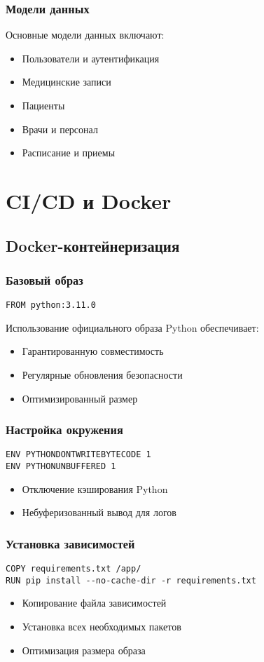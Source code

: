 \documentclass[12pt,a4paper]{article}
\begin{document}
\subsubsection{Модели данных}
Основные модели данных включают:
\begin{itemize}
    \item Пользователи и аутентификация
    \item Медицинские записи
    \item Пациенты
    \item Врачи и персонал
    \item Расписание и приемы
\end{itemize}

\section{CI/CD и Docker}
\subsection{Docker-контейнеризация}
\subsubsection{Базовый образ}
\begin{verbatim}
FROM python:3.11.0
\end{verbatim}
Использование официального образа Python обеспечивает:
\begin{itemize}
    \item Гарантированную совместимость
    \item Регулярные обновления безопасности
    \item Оптимизированный размер
\end{itemize}

\subsubsection{Настройка окружения}
\begin{verbatim}
ENV PYTHONDONTWRITEBYTECODE 1
ENV PYTHONUNBUFFERED 1
\end{verbatim}
\begin{itemize}
    \item Отключение кэширования Python
    \item Небуферизованный вывод для логов
\end{itemize}

\subsubsection{Установка зависимостей}
\begin{verbatim}
COPY requirements.txt /app/
RUN pip install --no-cache-dir -r requirements.txt
\end{verbatim}
\begin{itemize}
    \item Копирование файла зависимостей
    \item Установка всех необходимых пакетов
    \item Оптимизация размера образа
\end{itemize}
\end{document}
